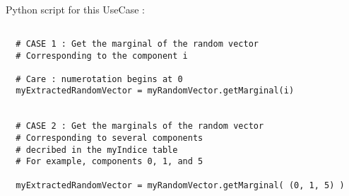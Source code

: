 \textspace\\
Python script for this UseCase :


\begin{lstlisting}

  # CASE 1 : Get the marginal of the random vector
  # Corresponding to the component i

  # Care : numerotation begins at 0
  myExtractedRandomVector = myRandomVector.getMarginal(i)


  # CASE 2 : Get the marginals of the random vector
  # Corresponding to several components
  # decribed in the myIndice table
  # For example, components 0, 1, and 5

  myExtractedRandomVector = myRandomVector.getMarginal( (0, 1, 5) )
\end{lstlisting}
